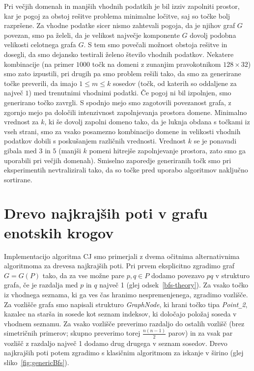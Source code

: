 \documentclass[a4paper, 12pt]{book}
\newcommand{\U}{\texttt{\_}}
\begin{document}
Pri večjih domenah in manjših vhodnih podatkih je bil izziv zapolniti prostor, kar je pogoj za obstoj rešitve problema minimalne ločitve, saj so točke bolj razpršene. Za vhodne podatke sicer nismo zahtevali pogoja, da je njihov graf $G$ povezan, smo pa želeli, da je velikost največje komponente $G$ dovolj podobna velikosti celotnega grafa $G$. S tem smo povečali možnost obstoja rešitve in dosegli, da smo dejansko testirali želeno število vhodnih podatkov. Nekatere kombinacije (na primer $1000$ točk na domeni z zunanjim pravokotnikom $128\times 32$) smo zato izpustili, pri drugih pa smo problem rešili tako, da smo za generirane točke preverili, da imajo $1 \le m \le k$ sosedov (točk, od katerih so oddaljene za največ $1$) med trenutnimi vhodnimi podatki. Če pogoj ni bil izpolnjen, smo generirano točko zavrgli. S spodnjo mejo smo zagotovili povezanost grafa, z zgornjo mejo pa določili intenzivnost zapolnjevanja prostora domene. Minimalno vrednost za $k$, ki še dovolj zapolni domeno tako, da je luknja obdana s točkami iz vseh strani, smo za vsako posamezno kombinacijo domene in velikosti vhodnih podatkov dobili s poskušanjem različnih vrednosti. Vrednost $k$ se je ponavadi gibala med $3$ in $5$ (manjši $k$ pomeni hitrejše zapolnjevanje prostora, zato smo ga uporabili pri večjih domenah). Smiselno zaporedje generiranih točk smo pri eksperimentih nevtralizirali tako, da so točke pred uporabo algoritmov naključno sortirane.

\section{Drevo najkrajših poti v grafu enotskih krogov}
Implementacijo algoritma CJ smo primerjali z dvema očitnima alternativnima algoritmoma za drevesa najkrajših poti. Pri prvem eksplicitno zgradimo graf $G=G(P)$ tako, da za vse možne pare $p, q\in P$ dodamo povezavo $pq$ v strukturo grafa, če je razdalja med $p$ in $q$ največ 1 (glej odsek~\ref{bfs-theory}). Za vsako točko iz vhodnega seznama, ki ga ves čas hranimo nespremenjenega, zgradimo vozlišče. Za vozlišče grafa smo napisali strukturo \textit{GraphNode}, ki hrani točko tipa \textit{Point\U 2}, kazalec na starša in sosede kot seznam indeksov, ki določajo položaj soseda v vhodnem seznamu. Za vsako vozlišče preverimo razdaljo do ostalih vozlišč (brez simetričnih primerov; skupno preverimo torej $\frac{n(n-1)}{2}$ parov) in za vsak par vozlišč z razdaljo največ 1 dodamo drug drugega v seznam sosedov. Drevo najkrajših poti potem zgradimo s klasičnim algoritmom za iskanje v širino (glej sliko~\ref{fig:genericBfs}). 
\end{document}

